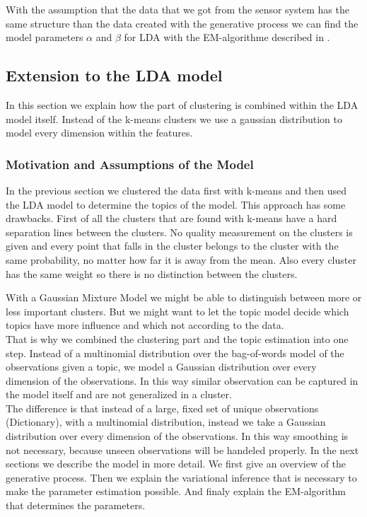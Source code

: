 \documentclass[11pt,a4paper]{article}
\begin{document}
With the assumption that the data that we got from the sensor system has the same structure than the data created with the generative process we can find the model parameters $\alpha$ and $\beta$ for LDA with the EM-algorithme described in \cite{blei2003latent}.

\subsection{Extension to the LDA model}
In this section we explain how the part of clustering is combined within the LDA model itself. Instead of the k-means clusters we use a gaussian distribution to model every dimension within the features.


  \subsubsection{Motivation and Assumptions of the Model}
  
  In the previous section we clustered the data first with k-means and then used the LDA model to determine the topics of the model. This approach has some drawbacks. First of all the clusters that are found with k-means have a hard separation lines between the clusters. No quality measurement on the clusters is given and every point that falls in the cluster belongs to the cluster with the same probability, no matter how far it is away from the mean. Also every cluster has the same weight so there is no distinction between the clusters.

  With a Gaussian Mixture Model we might be able to distinguish between more or less important clusters. But we might want to let the topic model decide which topics have more influence and which not according to the data.\\
That is why we combined the clustering part and the topic estimation into one step. Instead of a multinomial distribution over the bag-of-words model of the observations given a topic, we model a Gaussian distribution over every dimension of the observations. In this way similar observation can be captured in the model itself and are not generalized in a cluster.\\
The difference is that instead of a large, fixed set of unique observations (Dictionary), with a multinomial distribution, instead we take a Gaussian distribution over every dimension of the observations. In this way smoothing is not necessary, because unseen observations will be handeled properly.
In the next sections we describe the model in more detail. We first give an overview of the generative process. Then we explain the variational inference that is necessary to make the parameter estimation possible. And finaly explain the EM-algorithm that determines the parameters.
\end{document}
